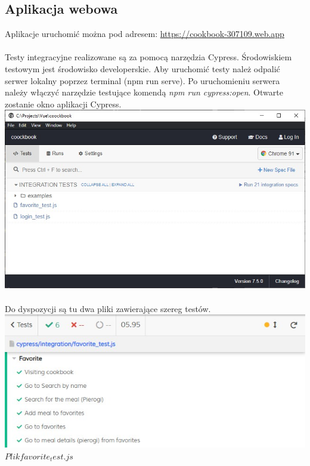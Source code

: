 \documentclass[12pt,a4paper]{article}
\begin{document}
		\subsection{Aplikacja webowa}	 
		\indent Aplikacje uruchomić można pod adresem: \href{https://cookbook-307109.web.app}{https://cookbook-307109.web.app} \\\\
	\indent Testy integracyjne realizowane są za pomocą narzędzia Cypress. Środowiskiem testowym jest środowisko developerskie. Aby uruchomić testy należ odpalić serwer lokalny poprzez terminal (npm run serve). Po uruchomieniu serwera należy włączyć narzędzie testujące komendą \textit{npm run cypress:open}. Otwarte zostanie okno aplikacji Cypress.\\
		\newline
	\includegraphics[width=1.0\linewidth]{img/cypress.jpg}\\\\
	\newline
	Do dyspozycji są tu dwa pliki zawierające szereg testów.
	\newline
	\newline
	\includegraphics[width=1.0\linewidth]{img/cypres1.jpg}\\
	\newline
	$Plik favorite_test.js$
	
\end{document}
